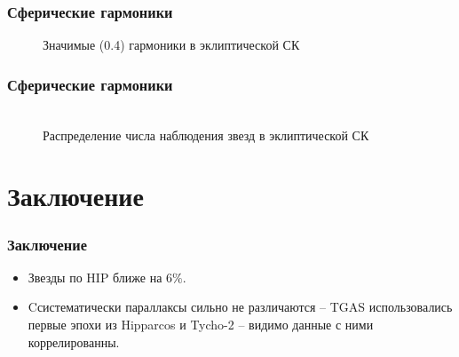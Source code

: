 \documentclass[12pt,aspectratio=43]{beamer}
\begin{document}
\begin{frame}
\frametitle{Сферические гармоники}
\begin{figure}[h!]
\caption{Значимые (0.4) гармоники в эклиптической СК}
\label{img:sfff}
\end{figure}
\end{frame}	

\begin{frame}[<alignment>]
\frametitle{Сферические гармоники}
\begin{figure}[h!]
\\{Распределение числа наблюдения звезд в эклиптической СК}
\label{img:nobs}
\end{figure}
\end{frame}	


\section{Заключение}\label{conclusion}
\begin{frame}
\frametitle{Заключение}

\begin{block}{}
\begin{itemize}
  \item Звезды по HIP ближе на $6\%$.
  \item Cсистематически параллаксы сильно не различаются -- TGAS использовались первые эпохи из Hipparcos и Tycho-2 -- видимо данные с ними коррелированны.
\end{itemize}
\end{block}
\end{frame}	
\end{document}
